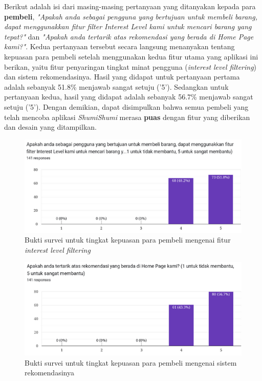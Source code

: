 \documentclass[a4paper]{article}
\begin{document}
\begin{enumerate}
\begin{itemize}
        Berikut adalah isi dari masing-masing pertanyaan yang ditanyakan kepada para \textbf{pembeli}, \textit{"Apakah anda sebagai pengguna yang bertujuan untuk membeli barang, dapat menggunakkan fitur filter Interest Level kami untuk mencari barang yang tepat?"} dan \textit{"Apakah anda tertarik atas rekomendasi yang berada di Home Page kami?"}. Kedua pertanyaan tersebut secara langsung menanyakan tentang kepuasan para pembeli setelah menggunakan kedua fitur utama yang aplikasi ini berikan, yaitu fitur penyaringan tingkat minat pengguna (\textit{interest level filtering}) dan sistem rekomendasinya. Hasil yang didapat untuk pertanyaan pertama adalah sebanyak 51.8\% menjawab sangat setuju ('5'). Sedangkan untuk pertanyaan kedua, hasil yang didapat adalah sebanyak 56.7\% menjawab sangat setuju ('5'). Dengan demikian, dapat disimpulkan bahwa semua pembeli yang telah mencoba aplikasi \textit{ShumiShumi} merasa \textbf{puas} dengan fitur yang diberikan dan desain yang ditampilkan. 

        \begin{figure}[h]
            \centering
            \includegraphics[scale=0.50]{images/evaluasi ui user 2/Survei 2 - Pertanyaan 1.png}
            \caption{Bukti survei untuk tingkat kepuasan para pembeli mengenai fitur \textit{interest level filtering}}
            \label{fig:userInterestLevel}
        \end{figure}
        
        \begin{figure}[h]
            \centering
            \includegraphics[scale=0.50]{images/evaluasi ui user 2/Survei 2 - Pertanyaan 2.png}
            \caption{Bukti survei untuk tingkat kepuasan para pembeli mengenai sistem rekomendasinya}
            \label{fig:userSistemRekomendasi}
        \end{figure}


\end{itemize}
\end{enumerate}
\end{document}
